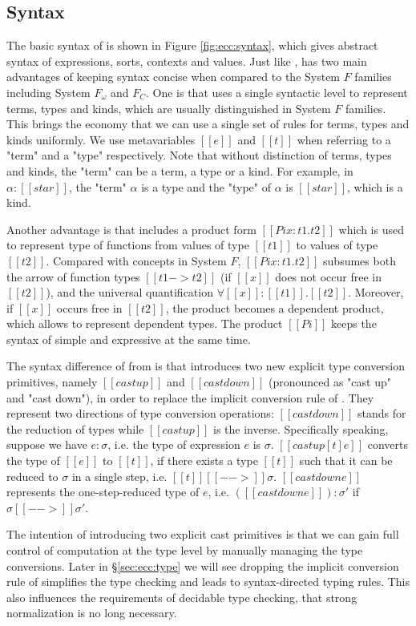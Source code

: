 \subsection{Syntax}\label{sec:ecc:syn}
The basic syntax of \expcc is shown in Figure \ref{fig:ecc:syntax}, which gives abstract syntax of expressions, sorts, contexts and values. Just like \cc, \expcc has two main advantages of keeping syntax concise when compared to the System $F$ families including System $F_\omega$ and $F_C$. One is that \expcc uses a single syntactic level to represent terms, types and kinds, which are usually distinguished in System $F$ families. This brings the economy that we can use a single set of rules for terms, types and kinds uniformly. We use metavariables $[[e]]$ and $[[t]]$ when referring to a "term" and a "type" respectively. Note that without distinction of terms, types and kinds, the "term" can be a term, a type or a kind. For example, in $\alpha : [[star]]$, the "term" $\alpha$ is a type and the "type" of $\alpha$ is $[[star]]$, which is a kind.

Another advantage is that \expcc includes a product form $[[Pi x:t1.t2]]$ which is used to represent type of functions from values of type $[[t1]]$ to values of type $[[t2]]$. Compared with concepts in System $F$, $[[Pi x:t1.t2]]$ subsumes both the arrow of function types $[[t1->t2]]$ (if $[[x]]$ does not occur free in $[[t2]]$), and the universal quantification $\forall [[x]]:[[t1]].[[t2]]$. Moreover, if $[[x]]$ occurs free in $[[t2]]$, the product becomes a dependent product, which allows to represent dependent types. The product $[[Pi]]$ keeps the syntax of \expcc simple and expressive at the same time.

The syntax difference of from \cc is that \expcc introduces two new explicit type conversion primitives, namely $[[castup]]$ and $[[castdown]]$ (pronounced as "cast up" and "cast down"), in order to replace the implicit conversion rule of \cc. They represent two directions of type conversion operations: $[[castdown]]$ stands for the reduction of types while $[[castup]]$ is the inverse. Specifically speaking, suppose we have $e:\sigma$, i.e. the type of expression $e$ is $\sigma$. $[[castup [t] e]]$ converts the type of $[[e]]$ to $[[t]]$, if there exists a type $[[t]]$ such that it can be reduced to $\sigma$ in a single step, i.e. $[[t]] [[-->]] \sigma$. $[[castdown e]]$ represents the one-step-reduced type of $e$, i.e. $([[castdown e]]) : \sigma'$ if $\sigma [[-->]] \sigma'$.

The intention of introducing two explicit cast primitives is that we can gain full control of computation at the type level by manually managing the type conversions. Later in \S \ref{sec:ecc:type} we will see dropping the implicit conversion rule of \cc simplifies the type checking and leads to syntax-directed typing rules. This also influences the requirements of decidable type checking, that strong normalization is no long necessary.

